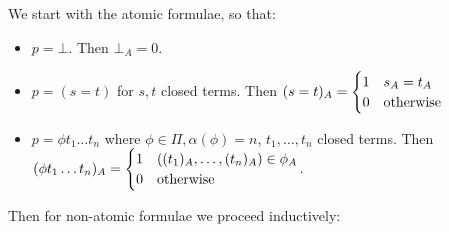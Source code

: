 \documentclass[10pt,a4paper]{article}
\begin{document}
We start with the atomic formulae, so that:
\begin{itemize}
\item $p = \bot$. Then $\bot_A = 0$.
\item $p = (s = t)$ for $s, t$ closed terms. Then $(s=t)_A = \begin{cases} 1 & s_A = t_A \\ 0 & \text{otherwise} \end{cases}$
\item $p = \phi t_1\ldots t_n$ where $\phi \in \Pi, \alpha(\phi) = n$, $t_1, \ldots, t_n$ closed terms. Then $(\phi t_1\ldots t_n)_A = \begin{cases} 1 & ((t_1)_A, \ldots, (t_n)_A) \in \phi_A \\0 & \text{otherwise}\end{cases}$.
\end{itemize}
Then for non-atomic formulae we proceed inductively:
\end{document}
